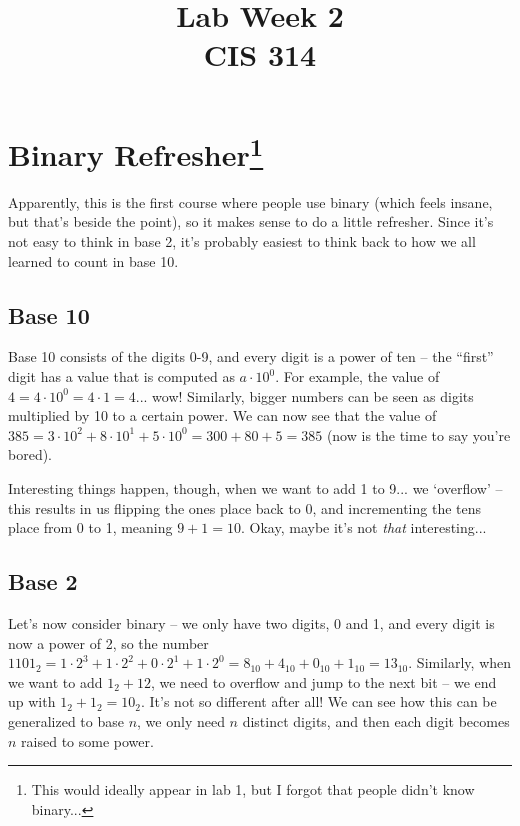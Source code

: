 \documentclass[10pt]{article}
\begin{document}
\title{Lab Week \raisebox{.22ex}{\large\#}2 \\
	CIS 314}
\author{}

\maketitle

\section*{Binary Refresher\footnote{This would ideally appear in lab 1, but I forgot that people didn't know binary...}}

Apparently, this is the first course where people use binary (which feels insane, but that's beside the point), so it makes sense to do a little refresher. Since it's not easy to think in base 2, it's probably easiest to think back to how we all learned to count in base 10. 

\subsection*{Base 10}

Base 10 consists of the digits 0-9, and every digit is a power of ten -- the ``first'' digit has a value that is computed as $a\cdot 10^0$. For example, the value of $4 = 4 \cdot 10^0 = 4 \cdot 1 = 4$... wow! Similarly, bigger numbers can be seen as digits multiplied by 10 to a certain power. We can now see that the value of $385 = 3\cdot 10^2 + 8\cdot 10^1 + 5\cdot 10^0 = 300 + 80 + 5 = 385$ (now is the time to say you're bored).


\noindent Interesting things happen, though, when we want to add 1 to 9... we `overflow' -- this results in us flipping the ones place back to 0, and incrementing the tens place from 0 to 1, meaning $9 + 1 = 10$. Okay, maybe it's not \textit{that} interesting...


\subsection*{Base 2}

Let's now consider binary -- we only have two digits, 0 and 1, and every digit is now a power of 2, so the number $1101_{2} = 1\cdot 2^3 + 1\cdot 2^2 + 0\cdot 2^1 + 1\cdot 2^0 = 8_{10} + 4_{10} + 0_{10} + 1_{10} = 13_{10}$. Similarly, when we want to add $1_{2} + 1{2}$, we need to overflow and jump to the next bit -- we end up with $1_{2} + 1_{2} = 10_{2}$. It's not so different after all! We can see how this can be generalized to base $n$, we only need $n$ distinct digits, and then each digit becomes $n$ raised to some power.
\end{document}

